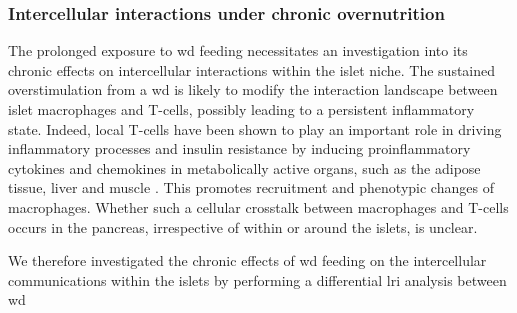 \subsubsection{\large Intercellular interactions under chronic overnutrition}

The prolonged exposure to \gls{wd} feeding necessitates an investigation into its chronic effects on intercellular interactions within the islet niche. The sustained overstimulation from a \gls{wd} is likely to modify the interaction landscape between islet macrophages and T-cells, possibly leading to a persistent inflammatory state. Indeed, local T-cells have been shown to play an important role in driving inflammatory processes and insulin resistance by inducing proinflammatory cytokines and chemokines in metabolically active organs, such as the adipose tissue, liver and muscle \textbf{\cite{mclaughlin_t-cell_2014,wu_skeletal_nodate,park_role_2022}}. This promotes recruitment and phenotypic changes of macrophages. Whether such a cellular crosstalk between macrophages and T-cells occurs in the pancreas, irrespective of within or around the islets, is unclear.\\

\par We therefore investigated the chronic effects of \gls{wd} feeding on the intercellular communications within the islets by performing a differential \gls{lri} analysis between \gls{wd}


